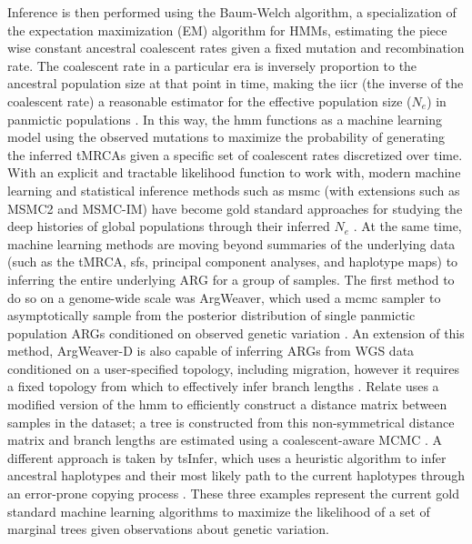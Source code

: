 Inference is then performed using the Baum-Welch algorithm, a specialization of the expectation maximization (EM) algorithm for HMMs, estimating the piece wise constant ancestral coalescent rates given a fixed mutation and recombination rate. The coalescent rate in a particular era is inversely proportion to the ancestral population size at that point in time, making the \gls{iicr} (the inverse of the coalescent rate) a reasonable estimator for the effective population size ($N_e$) in panmictic populations \cite{Chikhi2018}. In this way, the \gls{hmm} functions as a machine learning model using the observed mutations to maximize the probability of generating the inferred tMRCAs given a specific set of coalescent rates discretized over time. With an explicit and tractable likelihood function to work with, modern machine learning and statistical inference methods such as \gls{msmc} (with extensions such as MSMC2 and MSMC-IM) have become gold standard approaches for studying the deep histories of global populations through their inferred $N_e$ \cite{Wang2020,Fan2019b,Schiffels2014c}. At the same time, machine learning methods are moving beyond summaries of the underlying data (such as the tMRCA, \gls{sfs}, principal component analyses, and haplotype maps) to inferring the entire underlying ARG for a group of samples. The first method to do so on a genome-wide scale was ArgWeaver, which used a \gls{mcmc} sampler to asymptotically sample from the posterior distribution of single panmictic population ARGs conditioned on observed genetic variation \cite{Rasmussen2014a}. An extension of this method, ArgWeaver-D is also capable of inferring ARGs from WGS data conditioned on a user-specified topology, including migration, however it requires a fixed topology from which to effectively infer branch lengths \cite{Hubisz2020}. Relate uses a modified version of the \textcite{N2003} \gls{hmm} to efficiently construct a distance matrix between samples in the dataset; a tree is constructed from this non-symmetrical distance matrix and branch lengths are estimated using a coalescent-aware MCMC \cite{Speidel2019a}. A different approach is taken by tsInfer, which uses a heuristic algorithm to infer ancestral haplotypes and their most likely path to the current haplotypes through an error-prone copying process \cite{Kelleher2019a}. These three examples represent the current gold standard machine learning algorithms to maximize the likelihood of a set of marginal trees given observations about genetic variation.

